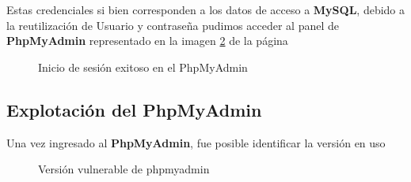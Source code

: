 \documentclass[a4paper]{article}
\begin{document}
\vspace{0.4cm}

Estas credenciales si bien corresponden a los datos de acceso a \textbf{MySQL}, debido a
la reutilización de Usuario y contraseña pudimos acceder al panel de \textbf{PhpMyAdmin}
representado en la imagen \ref{fig: Identifiedsubdomains} de la página \pageref{fig: Identifiedsubdomains}

\begin{figure}[H]
  \begin{center}
    \setlength{\fboxrule}{0.8pt}
    \caption{Inicio de sesión exitoso en el PhpMyAdmin}
    \label{fig: Identifiedsubdomains}
  \end{center}
\end{figure}

\clearpage

\subsection{ Explotación del PhpMyAdmin }

Una vez ingresado al \textbf{PhpMyAdmin}, fue posible identificar la versión en uso

\vspace{0.2cm}

\begin{figure}[H]
  \begin{center}
    \setlength{\fboxrule}{0.8pt}
    \caption{Versión vulnerable de phpmyadmin}
    \label{fig: Identifiedsubdomains}
  \end{center}
\end{figure}
\end{document}
